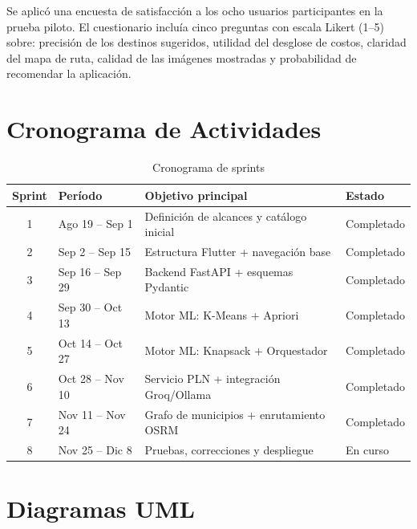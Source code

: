 \documentclass[12pt,letterpaper]{report}
\begin{document}
Se aplicó una encuesta de satisfacción a los ocho usuarios participantes en la prueba piloto.
El cuestionario incluía cinco preguntas con escala Likert (1–5) sobre: precisión de los
destinos sugeridos, utilidad del desglose de costos, claridad del mapa de ruta, calidad de las
imágenes mostradas y probabilidad de recomendar la aplicación.


\chapter{Cronograma de Actividades}
\label{anx:cronograma}


\begin{table}[H]
\centering
\caption{Cronograma de sprints}
\label{tab:gantt}
\begin{tabular}{clll}
\toprule
\textbf{Sprint} & \textbf{Período} & \textbf{Objetivo principal} & \textbf{Estado} \\
\midrule
1 & Ago 19 – Sep 1  & Definición de alcances y catálogo inicial & Completado \\
2 & Sep 2 – Sep 15  & Estructura Flutter + navegación base      & Completado \\
3 & Sep 16 – Sep 29 & Backend FastAPI + esquemas Pydantic        & Completado \\
4 & Sep 30 – Oct 13 & Motor ML: K-Means + Apriori               & Completado \\
5 & Oct 14 – Oct 27 & Motor ML: Knapsack + Orquestador          & Completado \\
6 & Oct 28 – Nov 10 & Servicio PLN + integración Groq/Ollama    & Completado \\
7 & Nov 11 – Nov 24 & Grafo de municipios + enrutamiento OSRM   & Completado \\
8 & Nov 25 – Dic 8  & Pruebas, correcciones y despliegue        & En curso   \\
\bottomrule
\end{tabular}
\end{table}

\chapter{Diagramas UML}
\label{anx:uml}

\end{document}

